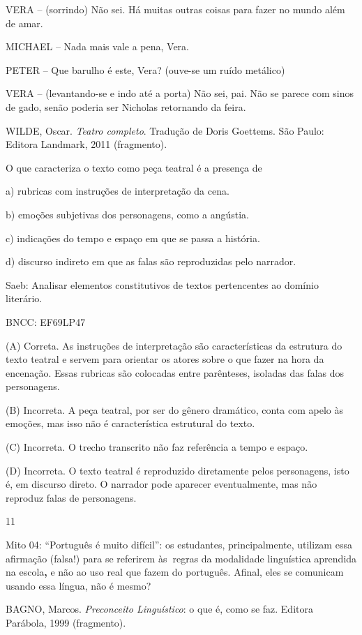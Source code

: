 VERA -- (sorrindo) Não sei. Há muitas outras coisas para fazer no mundo
além de amar.

MICHAEL -- Nada mais vale a pena, Vera.

PETER -- Que barulho é este, Vera? (ouve-se um ruído metálico)

VERA -- (levantando-se e indo até a porta) Não sei, pai. Não se parece
com sinos de gado, senão poderia ser Nicholas retornando da feira.

WILDE, Oscar. \emph{Teatro completo}. Tradução de Doris Goettems. São
Paulo: Editora Landmark, 2011 (fragmento).

O que caracteriza o texto como peça teatral é a presença de

a) rubricas com instruções de interpretação da cena.

b) emoções subjetivas dos personagens, como a angústia.

c) indicações do tempo e espaço em que se passa a história.

d) discurso indireto em que as falas são reproduzidas pelo narrador.

Saeb: Analisar elementos constitutivos de textos pertencentes ao domínio
literário.

BNCC: EF69LP47

(A) Correta. As instruções de interpretação são características da
estrutura do texto teatral e servem para orientar os atores sobre o que
fazer na hora da encenação. Essas rubricas são colocadas entre
parênteses, isoladas das falas dos personagens.

(B) Incorreta. A peça teatral, por ser do gênero dramático, conta com
apelo às emoções, mas isso não é característica estrutural do texto.

(C) Incorreta. O trecho transcrito não faz referência a tempo e espaço.

(D) Incorreta. O texto teatral é reproduzido diretamente pelos
personagens, isto é, em discurso direto. O narrador pode aparecer
eventualmente, mas não reproduz falas de personagens.

\num{11}

Mito 04: ``Português é muito difícil'': os estudantes, principalmente,
utilizam essa afirmação (falsa!) para se referirem às\textbf{~}regras da
modalidade linguística aprendida na escola\textbf{,} e não ao uso real
que fazem do português. Afinal, eles se comunicam usando essa língua,
não é mesmo?

BAGNO, Marcos. \emph{Preconceito Linguístico}: o que é, como se faz.
Editora Parábola, 1999 (fragmento).

